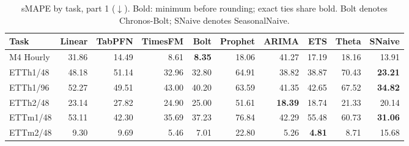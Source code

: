 \begin{table}[!htbp]
\centering
\caption{sMAPE by task, part 1 ($\downarrow$). Bold: minimum before rounding; exact ties share bold. Bolt denotes Chronos-Bolt; SNaive denotes SeasonalNaive.}
\label{tab:smape1}
\small
\setlength{\tabcolsep}{3.5pt}
\begin{tabular}{lrrrrrrrrr}
\hline
Task & Linear & TabPFN & TimesFM & Bolt & Prophet & ARIMA & ETS & Theta & SNaive \\
\hline
M4 Hourly & 31.86 & 14.49 & 8.61 & \textbf{8.35} & 18.06 & 41.27 & 17.19 & 18.16 & 13.91 \\
ETTh1/48 & 48.18 & 51.14 & 32.96 & 32.80 & 64.91 & 38.82 & 38.87 & 70.43 & \textbf{23.21} \\
ETTh1/96 & 52.27 & 49.51 & 43.00 & 40.20 & 63.59 & 41.35 & 42.65 & 67.52 & \textbf{34.82} \\
ETTh2/48 & 23.14 & 27.82 & 24.90 & 25.00 & 51.61 & \textbf{18.39} & 18.74 & 21.33 & 20.14 \\
ETTm1/48 & 53.11 & 42.30 & 35.69 & 37.23 & 76.84 & 42.29 & 55.48 & 60.73 & \textbf{31.06} \\
ETTm2/48 & 9.30 & 9.69 & 5.46 & 7.01 & 22.80 & 5.26 & \textbf{4.81} & 8.71 & 15.68 \\
\hline
\end{tabular}
\end{table}
